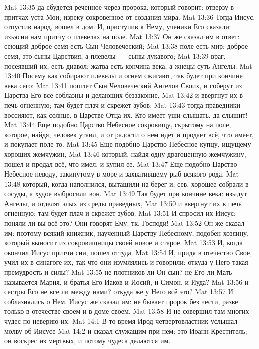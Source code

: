 \vs Mat 13:35 да сбудется реченное через пророка, который говорит: отверзу в притчах уста Мои; изреку сокровенное от создания мира.
\rsbpar\vs Mat 13:36 Тогда Иисус, отпустив народ, вошел в дом. И, приступив к Нему, ученики Его сказали: изъясни нам притчу о плевелах на поле.
\vs Mat 13:37 Он же сказал им в ответ: сеющий доброе семя есть Сын Человеческий;
\vs Mat 13:38 поле есть мир; доброе семя, это сыны Царствия, а плевелы~--- сыны лукавого;
\vs Mat 13:39 враг, посеявший их, есть диавол; жатва есть кончина века, а жнецы суть Ангелы.
\vs Mat 13:40 Посему как собирают плевелы и огнем сжигают, так будет при кончине века сего:
\vs Mat 13:41 пошлет Сын Человеческий Ангелов Своих, и соберут из Царства Его все соблазны и делающих беззаконие,
\vs Mat 13:42 и ввергнут их в печь огненную; там будет плач и скрежет зубов;
\vs Mat 13:43 тогда праведники воссияют, как солнце, в Царстве Отца их. Кто имеет уши слышать, да слышит!
\rsbpar\vs Mat 13:44 Еще подобно Царство Небесное сокровищу, скрытому на поле, которое, найдя, человек утаил, и от радости о нем идет и продает всё, что имеет, и покупает поле то.
\rsbpar\vs Mat 13:45 Еще подобно Царство Небесное купцу, ищущему хороших жемчужин,
\vs Mat 13:46 который, найдя одну драгоценную жемчужину, пошел и продал всё, что имел, и купил ее.
\rsbpar\vs Mat 13:47 Еще подобно Царство Небесное неводу, закинутому в море и захватившему рыб всякого рода,
\vs Mat 13:48 который, когда наполнился, вытащили на берег и, сев, хорошее собрали в сосуды, а худое выбросили вон.
\vs Mat 13:49 Так будет при кончине века: изыдут Ангелы, и отделят злых из среды праведных,
\vs Mat 13:50 и ввергнут их в печь огненную: там будет плач и скрежет зубов.
\vs Mat 13:51 И спросил их Иисус: поняли ли вы всё это? Они говорят Ему: тк, Господи!
\vs Mat 13:52 Он же сказал им: поэтому всякий книжник, наученный Царству Небесному, подобен хозяину, который выносит из сокровищницы своей новое и старое.
\rsbpar\vs Mat 13:53 И, когда окончил Иисус притчи сии, пошел оттуда.
\vs Mat 13:54 И, придя в отечество Свое, учил их в синагоге их, так что они изумлялись и говорили: откуда у Него такая премудрость и силы?
\vs Mat 13:55 не плотников ли Он сын? не Его ли Мать называется Мария, и братья Его Иаков и Иосий, и Симон, и Иуда?
\vs Mat 13:56 и сестры Его не все ли между нами? откуда же у Него всё это?
\vs Mat 13:57 И соблазнялись о Нем. Иисус же сказал им: не бывает пророк без чести, разве только в отечестве своем и в доме своем.
\vs Mat 13:58 И не совершил там многих чудес по неверию их.
\vs Mat 14:1 В то время Ирод четвертовластник услышал молву об Иисусе
\vs Mat 14:2 и сказал служащим при нем: это Иоанн Креститель; он воскрес из мертвых, и потому чудеса делаются им.
